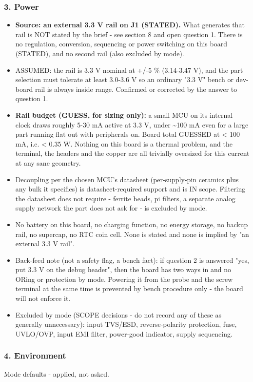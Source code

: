 \documentclass[11pt,a4paper]{article}
\begin{document}
\subsubsection*{3. Power}
\begin{itemize}
\item \textbf{Source: an external 3.3 V rail on J1 (STATED).} What generates that rail
is NOT stated by the brief - see section 8 and open question 1. There is no
regulation, conversion, sequencing or power switching on this board
(STATED), and no second rail (also excluded by mode).
\item ASSUMED: the rail is 3.3 V nominal at +/-5 \% (3.14-3.47 V), and the part
selection must tolerate at least 3.0-3.6 V so an ordinary "3.3 V" bench or
dev-board rail is always inside range. Confirmed or corrected by the answer
to question 1.
\item \textbf{Rail budget (GUESS, for sizing only):} a small MCU on its internal clock
draws roughly 5-30 mA active at 3.3 V, under \textasciitilde{}100 mA even for a large part
running flat out with peripherals on. Board total GUESSED at \textless{} 100 mA, i.e.
\textless{} 0.35 W. Nothing on this board is a thermal problem, and the terminal, the
headers and the copper are all trivially oversized for this current at any
sane geometry.
\item Decoupling per the chosen MCU's datasheet (per-supply-pin ceramics plus any
bulk it specifies) is datasheet-required support and is IN scope. Filtering
the datasheet does not require - ferrite beads, pi filters, a separate
analog supply network the part does not ask for - is excluded by mode.
\item No battery on this board, no charging function, no energy storage, no backup
rail, no supercap, no RTC coin cell. None is stated and none is implied by
"an external 3.3 V rail".
\item Back-feed note (not a safety flag, a bench fact): if question 2 is answered
"yes, put 3.3 V on the debug header", then the board has two ways in and no
ORing or protection by mode. Powering it from the probe and the screw
terminal at the same time is prevented by bench procedure only - the board
will not enforce it.
\item Excluded by mode (SCOPE decisions - do not record any of these as generally
unnecessary): input TVS/ESD, reverse-polarity protection, fuse, UVLO/OVP,
input EMI filter, power-good indicator, supply sequencing.
\end{itemize}
\subsubsection*{4. Environment}
Mode defaults - applied, not asked.
\end{document}

